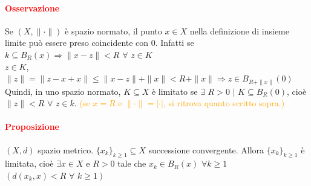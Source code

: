 \documentclass{article}
\begin{document}
\paragraph{\textcolor{red}{Osservazione}}
Se $(X, \parallel \cdot \parallel)$ è spazio normato, il punto $x \in X$ nella definizione di insieme limite può essere preso coincidente con $0$. Infatti se $k \subseteq B_R(x) \Rightarrow \parallel x-z \parallel < R \,\, \forall \,\, z \in K$\\
$z \in K$, $\parallel z \parallel =\parallel z-x+x \parallel \leq \parallel x-z \parallel + \parallel x\parallel <R+\parallel x \parallel \Rightarrow z \in B_{R+\parallel x\parallel}(0)$\\
Quindi, in uno spazio normato, $K \subseteq X$ è limitato se $\exists \,\, R >0 \,\,|\,\, K \subseteq B_R(0)$, cioè $\parallel z \parallel < R \,\,\forall\,\, z \in k$. \textcolor{orange}{(se $x = R$ e $\parallel \cdot \parallel = |\cdot|$, si ritrova quanto scritto sopra.)}

\paragraph{\textcolor{red}{Proposizione}}
$(X,d)$ spazio metrico. $\{x_k\}_{k\geq 1} \subseteq X$ successione convergente. Allora $\{x_k\}_{k \geq 1}$ è limitata, cioè $\exists x \in X$ e $R >0$ tale che $x_k \in B_R(x)\,\, \forall k \geq 1$\\
$(d(x_k,x)< R \,\, \forall \,\, k \geq 1)$\\
\end{document}
